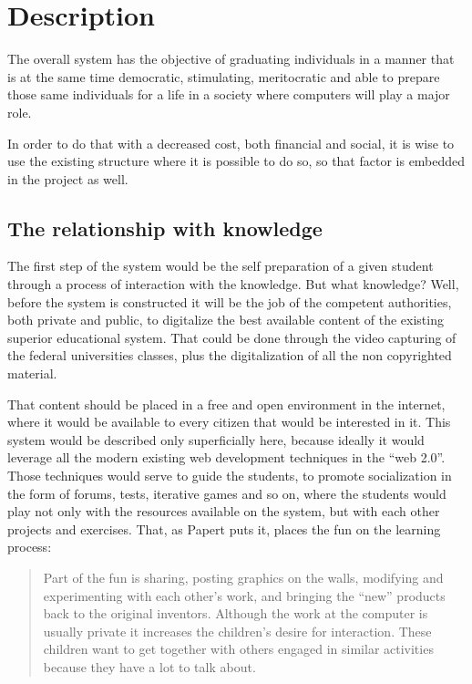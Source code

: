 \section{Description}

The overall system has the objective of graduating individuals in a manner that
is at the same time democratic, stimulating, meritocratic and able to prepare 
those same individuals for a life in a society where computers will
play a major role.

In order to do that with a decreased cost, both financial and social, it is wise
to use the existing structure where it is possible to do so, so that factor is
embedded in the project as well.

\subsection{The relationship with knowledge}

The first step of the system would be the self preparation of a given student
through a process of interaction with the knowledge. But what knowledge? Well,
before the system is constructed it will be the job of the competent
authorities, both private and public, to digitalize the best available content
of the existing superior educational system. That could be done through the
video capturing of the federal universities classes, plus the digitalization of
all the non copyrighted material. 

That content should be placed in a free and open environment in the internet,
where it would be available to every citizen that would be interested in it.
This system would be described only superficially here, because ideally it would
leverage all the modern existing web development techniques in the ``web 2.0''.
Those techniques would serve to guide the students, to promote socialization in
the form of forums, tests, iterative games and so on, where the students would
play not only with the resources available on the system, but with each other
projects and exercises. That, as Papert puts it, places the fun on the learning
process:

\begin{quotation} 
    Part of the fun is sharing, posting graphics on the walls, modifying and
    experimenting with each other's work, and bringing the ``new'' products back to
    the original inventors. Although the work at the computer is usually private it
    increases the children's desire for interaction. These children want to get
    together with others engaged in similar activities because they have a lot to
    talk about. 
    \cite{education:papert_mindstorms}
\end{quotation}


